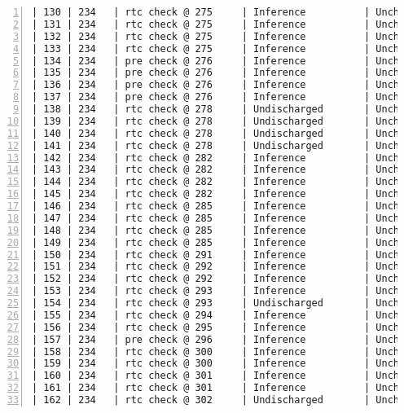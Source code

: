\begin{lstlisting}[gobble=0, numbers=left, caption={POGS report for PCA Pump prototype}, label={listing:pca_ravenscar:pogs_full}]
| 130 | 234   | rtc check @ 275     | Inference          | Unchecked |   IU   |
| 131 | 234   | rtc check @ 275     | Inference          | Unchecked |   IU   |
| 132 | 234   | rtc check @ 275     | Inference          | Unchecked |   IU   |
| 133 | 234   | rtc check @ 275     | Inference          | Unchecked |   IU   |
| 134 | 234   | pre check @ 276     | Inference          | Unchecked |   IU   |
| 135 | 234   | pre check @ 276     | Inference          | Unchecked |   IU   |
| 136 | 234   | pre check @ 276     | Inference          | Unchecked |   IU   |
| 137 | 234   | pre check @ 276     | Inference          | Unchecked |   IU   |
| 138 | 234   | rtc check @ 278     | Undischarged       | Unchecked |   UU   |
| 139 | 234   | rtc check @ 278     | Undischarged       | Unchecked |   UU   |
| 140 | 234   | rtc check @ 278     | Undischarged       | Unchecked |   UU   |
| 141 | 234   | rtc check @ 278     | Undischarged       | Unchecked |   UU   |
| 142 | 234   | rtc check @ 282     | Inference          | Unchecked |   IU   |
| 143 | 234   | rtc check @ 282     | Inference          | Unchecked |   IU   |
| 144 | 234   | rtc check @ 282     | Inference          | Unchecked |   IU   |
| 145 | 234   | rtc check @ 282     | Inference          | Unchecked |   IU   |
| 146 | 234   | rtc check @ 285     | Inference          | Unchecked |   IU   |
| 147 | 234   | rtc check @ 285     | Inference          | Unchecked |   IU   |
| 148 | 234   | rtc check @ 285     | Inference          | Unchecked |   IU   |
| 149 | 234   | rtc check @ 285     | Inference          | Unchecked |   IU   |
| 150 | 234   | rtc check @ 291     | Inference          | Unchecked |   IU   |
| 151 | 234   | rtc check @ 292     | Inference          | Unchecked |   IU   |
| 152 | 234   | rtc check @ 292     | Inference          | Unchecked |   IU   |
| 153 | 234   | rtc check @ 293     | Inference          | Unchecked |   IU   |
| 154 | 234   | rtc check @ 293     | Undischarged       | Unchecked |   UU   |
| 155 | 234   | rtc check @ 294     | Inference          | Unchecked |   IU   |
| 156 | 234   | rtc check @ 295     | Inference          | Unchecked |   IU   |
| 157 | 234   | pre check @ 296     | Inference          | Unchecked |   IU   |
| 158 | 234   | rtc check @ 300     | Inference          | Unchecked |   IU   |
| 159 | 234   | rtc check @ 300     | Inference          | Unchecked |   IU   |
| 160 | 234   | rtc check @ 301     | Inference          | Unchecked |   IU   |
| 161 | 234   | rtc check @ 301     | Inference          | Unchecked |   IU   |
| 162 | 234   | rtc check @ 302     | Undischarged       | Unchecked |   UU   |

\end{lstlisting}
